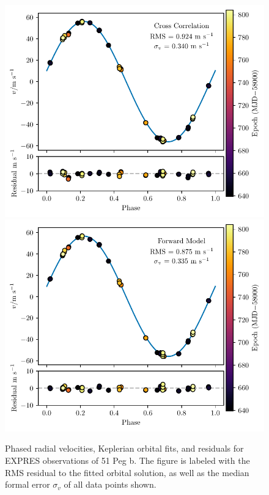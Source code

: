 \begin{figure}[htbp]
    \centering
    \includegraphics{figures-4/217014_ccf.pdf}
    \includegraphics{figures-4/217014_cbc.pdf}
    \caption{Phased radial velocities, Keplerian orbital fits, and residuals for EXPRES observations of 51 Peg b. The figure is labeled with the RMS residual to the fitted orbital solution, as well as the median formal error $\sigma_v$ of all data points shown.}
    \label{fig:217014}
\end{figure}

